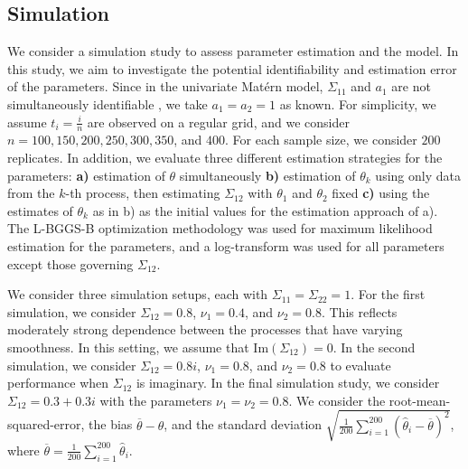 \documentclass[11pt]{article}
\begin{document}


\subsection{Simulation}\label{sec:simulation}

We consider a simulation study to assess parameter estimation and the model. In this study, we aim to investigate the potential identifiability and estimation error of the parameters. Since in the univariate Mat\'ern model, $\Sigma_{11}$ and $a_1$ are not simultaneously identifiable \citep{zhang_inconsistent_2004}, we take $a_1 = a_2 = 1$ as known. 
For simplicity, we assume $t_i = \frac{i}{n}$ are observed on a regular grid, and we consider $ n= 100, 150, 200, 250, 300, 350$, and $400$. For each sample size, we consider $200$ replicates.  
In addition, we evaluate three different estimation strategies for the parameters: {\bf a)} estimation of $\theta$ simultaneously {\bf b)} estimation of $\theta_k$ using only data from the $k$-th process, then estimating $\Sigma_{12}$ with $\theta_1$ and $\theta_2$ fixed {\bf c)} using the estimates of $\theta_k$ as in b) as the initial values for the estimation approach of a). The L-BGGS-B optimization methodology was used for maximum likelihood estimation for the parameters, and a log-transform was used for all parameters except those governing $\Sigma_{12}$.

We consider three simulation setups, each with $\Sigma_{11} = \Sigma_{22} = 1$.
For the first simulation, we consider $\Sigma_{12} = 0.8$, $\nu_1 = 0.4$, and $\nu_2 = 0.8$. This reflects moderately strong dependence between the processes that have varying smoothness. In this setting, we assume that $\textrm{Im}(\Sigma_{12}) = 0$. In the second simulation, we consider $\Sigma_{12} = 0.8i$, $\nu_1 = 0.8$, and $\nu_2 = 0.8$ to evaluate performance when $\Sigma_{12}$ is imaginary. In the final simulation study, we consider $\Sigma_{12} = 0.3 + 0.3i$ with the parameters $\nu_1 = \nu_2 = 0.8$. We consider the root-mean-squared-error, the bias $\overline{\theta} - \theta$, and the standard deviation $\sqrt{\frac{1}{200}\sum_{i=1}^{200} (\hat{\theta}_i - \overline{\theta})^2}$, where $\overline{\theta} = \frac{1}{200}\sum_{i=1}^{200} \hat{\theta}_i$.
\end{document}
